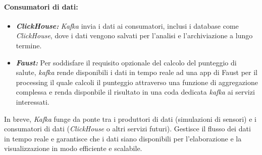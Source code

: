 \paragraph*{Consumatori di dati:}
\begin{itemize}
  \item \textbf{\textit{ClickHouse:}} \textit{Kafka} invia i dati ai consumatori, inclusi i database come \textit{ClickHouse}, dove i dati vengono salvati per l'analisi e l'archiviazione a lungo termine.
  \item \textbf{\textit{Faust:}} Per soddisfare il requisito opzionale del calcolo del punteggio di salute, \textit{kafka} rende disponibili i dati in tempo reale ad una app di Faust per il processing il quale calcoli il punteggio attraverso una funzione di aggregazione complessa e renda  disponbile il risultato in una coda dedicata \textit{kafka} ai servizi interessati.
\end{itemize}

In breve, \textit{Kafka} funge da ponte tra i produttori di dati (simulazioni di sensori) e i consumatori di dati (\textit{ClickHouse} o altri servizi futuri). Gestisce il flusso dei dati in tempo reale e garantisce che i dati siano disponibili per l'elaborazione e la visualizzazione in modo efficiente e scalabile.
